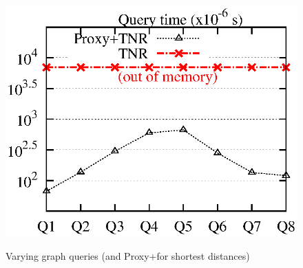 \begin{figure}[t!]
\begin{center}
{\includegraphics[scale=0.422]{./exp/query_cus_dist_tnr.eps}}
\end{center}
\vspace{-0.5ex}
\caption{Varying graph queries (\tnr and Proxy+\tnr for shortest distances)}
\label{fig:performance_dist_queries_tnr}
\vspace{-1ex}
\end{figure}


